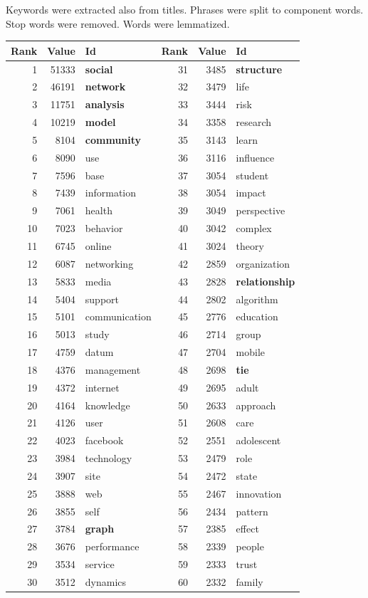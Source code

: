 \documentclass[hyperref={pdfstartview={FitBH -32768},
                         pdfpagemode=FullScreen,
                         plainpages=false,
                         colorlinks=true}
              ]{beamer}
\begin{document}
\begin{frame}[fragile]
\renewcommand{\arraystretch}{0.82}
\tiny
Keywords were extracted also from titles. Phrases were split to component words. Stop words were removed. Words were lemmatized.
\begin{center}
\begin{tabular}{r|r|l||r|r|l}
Rank&  	Value&  	Id&  	Rank&  	Value&  	Id\\ \hline
1&  	51333&  	\textbf{social}&  	31&  	3485&  	\textbf{structure}\\
2&  	46191&  	\textbf{network}&  	32&  	3479&  	life\\
3&  	11751&         \textbf {analysis}&  	33&  	3444&  	risk\\
4&  	10219&  	\textbf{model}&  	34&  	3358&  	research\\
5&  	8104&  	\textbf{community}&  	35&  	3143&  	learn\\
6&  	8090&  	use&  	36&  	3116&  	influence\\
7&  	7596&  	base&  	37&  	3054&  	student\\
8&  	7439&  	information&  	38&  	3054&  	impact\\
9&  	7061&  	health&  	39&  	3049&  	perspective\\
10&  	7023&  	behavior&  	40&  	3042&  	complex\\
11&  	6745&  	online&  	41&  	3024&  	theory\\
12&  	6087&  	networking&  	42&  	2859&  	organization\\
13&  	5833&  	media&  	43&  	2828&  	\textbf{relationship}\\
14&  	5404&  	support&  	44&  	2802&  	algorithm\\
15&  	5101&  	communication&  	45&  	2776&  	education\\
16&  	5013&  	study&  	46&  	2714&  	group\\
17&  	4759&  	datum&  	47&  	2704&  	mobile\\
18&  	4376&  	management&  	48&  	2698&  	\textbf{tie}\\
19&  	4372&  	internet&  	49&  	2695&  	adult\\
20&  	4164&  	knowledge&  	50&  	2633&  	approach\\
21&  	4126&  	user&  	51&  	2608&  	care\\
22&  	4023&  	facebook&  	52&  	2551&  	adolescent\\
23&  	3984&  	technology&  	53&  	2479&  	role\\
24&  	3907&  	site&  	54&  	2472&  	state\\
25&  	3888&  	web&  	55&  	2467&  	innovation\\
26&  	3855&  	self&  	56&  	2434&  	pattern\\
27&  	3784&  	\textbf{graph}&  	57&  	2385&  	effect\\
28&  	3676&  	performance&  	58&  	2339&  	people\\
29&  	3534&  	service&  	59&  	2333&  	trust\\
30&  	3512&  	dynamics&  	60&  	2332&  	family\\ \hline
\end{tabular}
\end{center}
\end{frame}
\end{document}
